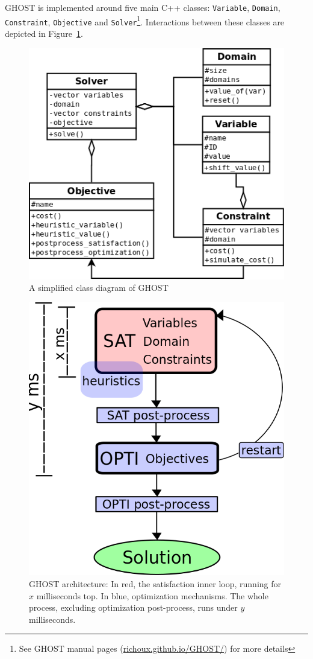\documentclass{article}
\newcommand{\ghost}{\textsc{GHOST}\xspace}
\begin{document}
\ghost is implemented around five main C++ classes: \texttt{Variable},
\texttt{Domain},    \texttt{Constraint},     \texttt{Objective}    and
\texttt{Solver}\footnote{See        \ghost         manual        pages
  (\href{http://richoux.github.io/GHOST/}{richoux.github.io/GHOST/})
  for more  details}. Interactions between these  classes are depicted
in Figure~\ref{fig:ghost}.
\begin{figure}[t]
  \centering
  \includegraphics[width=0.6\linewidth]{figs/ghost_vert.png}
  \caption{A simplified class diagram of \ghost}
  \label{fig:ghost}
\end{figure}
\begin{figure}[t]
  \centering
  \includegraphics[width=0.6\linewidth]{figs/archi2.png}
  \caption{\ghost architecture:  In red, the satisfaction  inner loop,
    running  for   $x$  milliseconds   top.   In   blue,  optimization
    mechanisms.    The    whole   process,    excluding   optimization
    post-process, runs under $y$ milliseconds.}
  \label{fig:archi}
\end{figure}
\end{document}
